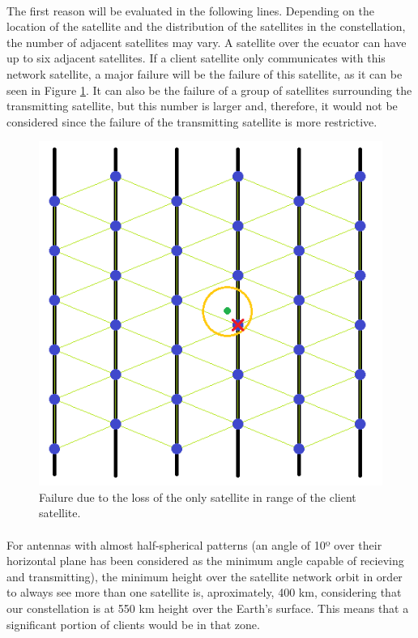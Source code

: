 \paragraph{}The first reason will be evaluated in the following lines. Depending on the location of the satellite and the distribution of the satellites in the constellation, the number of adjacent satellites may vary. A satellite over the ecuator can have up to six adjacent satellites. If a client satellite only communicates with this network satellite, a major failure will be the failure of this satellite, as it can be seen in Figure \ref{fig:critical1}. It can also be the failure of a group of satellites surrounding the transmitting satellite, but this number is larger and, therefore, it would not be considered since the failure of the transmitting satellite is more restrictive.
\begin{figure}[H]
\begin{center}
\includegraphics[scale=0.5]{./sections/Constellation_Deployment/S5-Spare_Strategy/critical1.png}
\caption[1 communication range failure]{Failure due to the loss of the only satellite in range of the client satellite.}
\label{fig:critical1}
\end{center}
\end{figure}
\paragraph{}For antennas with almost half-spherical patterns (an angle of 10º over their horizontal plane has been considered as the minimum angle capable of recieving and transmitting), the minimum height over the satellite network orbit in order to always see more than one satellite is, aproximately, 400 km, considering that our constellation is at 550 km height over the Earth's surface. This means that a significant portion of clients would be in that zone.

